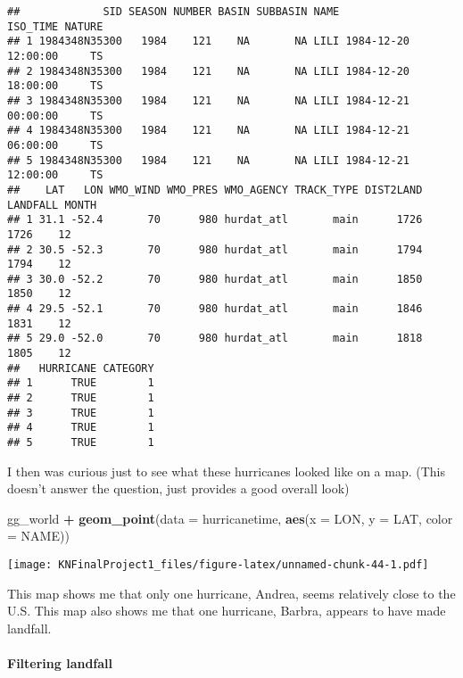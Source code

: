 \documentclass[
]{article}
\newenvironment{Shaded}{\begin{snugshade}}{\end{snugshade}}
\newcommand{\DataTypeTok}[1]{\textcolor[rgb]{0.13,0.29,0.53}{#1}}
\newcommand{\KeywordTok}[1]{\textcolor[rgb]{0.13,0.29,0.53}{\textbf{#1}}}
\newcommand{\NormalTok}[1]{#1}
\newcommand{\OperatorTok}[1]{\textcolor[rgb]{0.81,0.36,0.00}{\textbf{#1}}}
\newcommand{\StringTok}[1]{\textcolor[rgb]{0.31,0.60,0.02}{#1}}
\begin{document}
\begin{verbatim}
##             SID SEASON NUMBER BASIN SUBBASIN NAME            ISO_TIME NATURE
## 1 1984348N35300   1984    121    NA       NA LILI 1984-12-20 12:00:00     TS
## 2 1984348N35300   1984    121    NA       NA LILI 1984-12-20 18:00:00     TS
## 3 1984348N35300   1984    121    NA       NA LILI 1984-12-21 00:00:00     TS
## 4 1984348N35300   1984    121    NA       NA LILI 1984-12-21 06:00:00     TS
## 5 1984348N35300   1984    121    NA       NA LILI 1984-12-21 12:00:00     TS
##    LAT   LON WMO_WIND WMO_PRES WMO_AGENCY TRACK_TYPE DIST2LAND LANDFALL MONTH
## 1 31.1 -52.4       70      980 hurdat_atl       main      1726     1726    12
## 2 30.5 -52.3       70      980 hurdat_atl       main      1794     1794    12
## 3 30.0 -52.2       70      980 hurdat_atl       main      1850     1850    12
## 4 29.5 -52.1       70      980 hurdat_atl       main      1846     1831    12
## 5 29.0 -52.0       70      980 hurdat_atl       main      1818     1805    12
##   HURRICANE CATEGORY
## 1      TRUE        1
## 2      TRUE        1
## 3      TRUE        1
## 4      TRUE        1
## 5      TRUE        1
\end{verbatim}

I then was curious just to see what these hurricanes looked like on a
map. (This doesn't answer the question, just provides a good overall
look)

\begin{Shaded}
\begin{Highlighting}[]
\NormalTok{gg_world }\OperatorTok{+}\StringTok{ }
\StringTok{  }\KeywordTok{geom_point}\NormalTok{(}\DataTypeTok{data =}\NormalTok{ hurricanetime, }\KeywordTok{aes}\NormalTok{(}\DataTypeTok{x =}\NormalTok{ LON, }\DataTypeTok{y =}\NormalTok{ LAT, }\DataTypeTok{color =}\NormalTok{ NAME))}
\end{Highlighting}
\end{Shaded}

\texttt{[image: KNFinalProject1\_files/figure-latex/unnamed-chunk-44-1.pdf]}

This map shows me that only one hurricane, Andrea, seems relatively
close to the U.S. This map also shows me that one hurricane, Barbra,
appears to have made landfall.

\hypertarget{filtering-landfall}{%
\paragraph{Filtering landfall}\label{filtering-landfall}}
\end{document}

